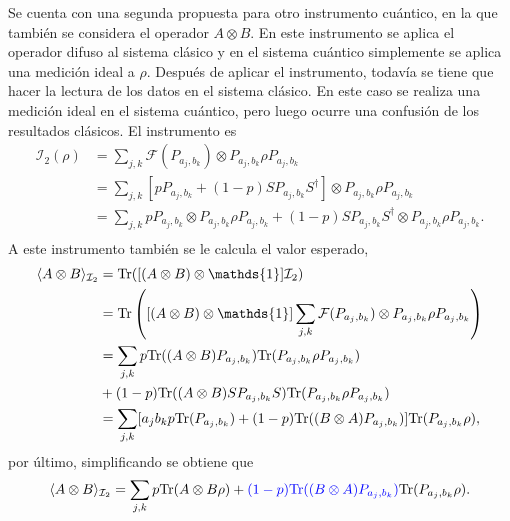 Se cuenta con una segunda propuesta para otro instrumento cuántico, en la que también se considera el operador $A\otimes B$. En este instrumento se aplica el operador difuso al sistema clásico y en el sistema cuántico simplemente se aplica una medición ideal a $\rho$.  Después de aplicar el instrumento, todavía se tiene que hacer la lectura de los datos en el sistema clásico. En este caso se realiza una medición ideal en el sistema cuántico, pero luego ocurre una confusión de los resultados clásicos. El instrumento es \begin{equation}\label{second-instrument}
    \begin{split}
        \mathcal{I}_2(\rho)&=\sum_{j,k}\mathcal{F}(P_{a_j,b_k})\otimes P_{a_j,b_k} \rho P_{a_j,b_k}\\
        &=\sum_{j,k}[pP_{a_j,b_k}+(1-p)SP_{a_j,b_k}S^\dagger]\otimes P_{a_j,b_k} \rho P_{a_j,b_k}\\
        &=\sum_{j,k} pP_{a_j,b_k} \otimes P_{a_j,b_k} \rho P_{a_j,b_k}+(1-p)SP_{a_j,b_k}S^\dagger\otimes P_{a_j,b_k} \rho P_{a_j,b_k}.\\
    \end{split}
\end{equation} 
 A este instrumento también se le calcula el valor esperado, \begin{equation*}
    \begin{split}
        \la A\otimes B \ra_{\mathcal{I}_2}&=\tr([(A\otimes B) \otimes \mathds{1}]\mathcal{I}_2)\\
        &=\tr\left([(A\otimes B) \otimes \mathds{1}]\sum_{j,k}\mathcal{F}(P_{a_j,b_k})\otimes P_{a_j,b_k} \rho P_{a_j,b_k}\right)\\
        &=\sum_{j,k} p\tr((A\otimes B)P_{a_j,b_k}) \tr (P_{a_j,b_k} \rho P_{a_j,b_k})\\&
        +(1-p )\tr((A\otimes B)SP_{a_j,b_k}S) \tr(P_{a_j,b_k} \rho P_{a_j,b_k})\\
        &=\sum_{j,k}[a_{j} b_k p\tr(P_{a_j,b_k})+(1-p)\tr( (B\otimes A)P_{a_j,b_k}) ]\tr(P_{a_j,b_k} \rho),\\
    \end{split}
\end{equation*}por último, simplificando se obtiene que \begin{equation}\label{expectationvalueSecondInstrument}
    \begin{split}
        \langle A\otimes B \rangle_{\mathcal{I}_2}&=\sum_{j,k}p{\rm Tr}(A\otimes B\rho)+{\color{blue}(1-p){\rm Tr}( (B\otimes A)P_{a_j,b_k})}{\rm Tr}(P_{a_j,b_k} \rho). \\
    \end{split}
\end{equation}

